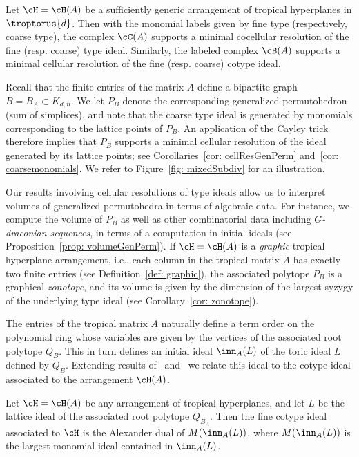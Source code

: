 \begin{thm} \label{thm: resolutions}
Let $\cH = \cH(A)$ be a sufficiently generic arrangement of tropical hyperplanes in $\troptorus{d}$. Then with the monomial labels given by fine type (respectively, coarse type), the complex $\cC(A)$ supports a minimal cocellular resolution of the fine (resp. coarse) type ideal. Similarly, the labeled complex $\cB(A)$ supports a minimal cellular resolution of the fine (resp. coarse) cotype ideal.
\end{thm}

Recall that the finite entries of the matrix $A$ define a bipartite graph $B = B_A \subset K_{d,n}$.  We let $P_B$ denote the corresponding generalized permutohedron (sum of simplices), and note that the coarse type ideal is generated by monomials corresponding to the lattice points of $P_B$. An application of the Cayley trick therefore implies that $P_B$ supports a minimal cellular resolution of the ideal generated by its lattice points; see Corollaries~\ref{cor: cellResGenPerm} and~\ref{cor: coarsemonomials}. 
We refer to Figure~\ref{fig: mixedSubdiv} for an illustration.

Our results involving cellular resolutions of type ideals allow us to interpret volumes of generalized permutohedra in terms of algebraic data. For instance, we compute the volume of $P_B$
as well as other combinatorial data including \emph{$G$-draconian sequences}, 
in terms of a computation in initial ideals (see Proposition~\ref{prop: volumeGenPerm}). If $\cH = \cH(A)$ is a \textit{graphic} tropical hyperplane arrangement, i.e., each column in the tropical matrix $A$ has exactly two finite entries (see Definition~\ref{def: graphic}), the associated polytope $P_B$ is a graphical \emph{zonotope}, and its volume is given by the dimension of the largest syzygy of the underlying type ideal (see Corollary~\ref{cor: zonotope}).  

The entries of the tropical matrix $A$ naturally define a term order on the polynomial ring whose variables are given by the vertices of the associated root polytope $Q_B$. This in turn defines an initial ideal $\inn_A(L)$ of the toric ideal $L$ defined by $Q_B$. Extending results of~\cite{block2006tropical} and~\cite{dochtermann2012tropical} we relate this ideal to the cotype ideal associated to the arrangement ${\cH}(A)$.

\begin{thm} \label{thm: Alexdual} Let $\cH = \cH(A)$ be any arrangement of tropical hyperplanes, and let $L$ be the lattice ideal of the associated root polytope $Q_{B_A}$. Then the fine cotype ideal associated to $\cH$ is the Alexander dual of $M(\inn_A(L))$, where $M(\inn_A(L))$ is the largest monomial ideal contained in $\inn_A(L)$.
\end{thm}


